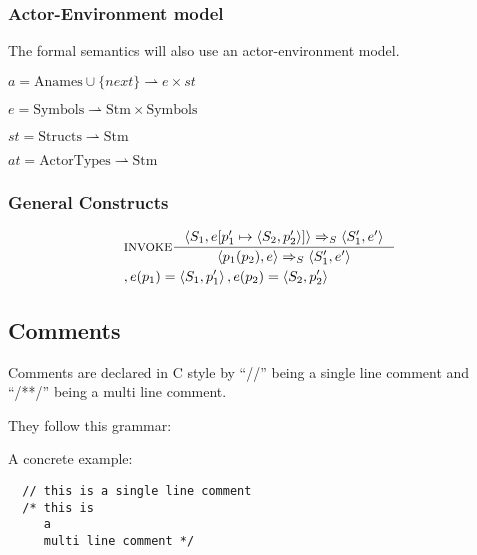 
\subsubsection{Actor-Environment model}
The formal semantics will also use an actor-environment model.

$a = \text{Anames} \cup \{next\} \rightharpoonup e \times st$

$e = \text{Symbols} \rightharpoonup \text{Stm} \times \text{Symbols}$

$st = \text{Structs} \rightharpoonup \text{Stm}$

$at = \text{ActorTypes} \rightharpoonup \text{Stm}$

\subsubsection{General Constructs}
\begin{align*}
&\inference[$\text{INVOKE}$]{\Braket{S_1,e[p_1' \mapsto \Braket{S_2,p_2'}]} \Rightarrow_S \Braket{S_1',e'}}
                  {\Braket{p_1(p_2),e} \Rightarrow_S \Braket{S_1',e'}}
\\
&									{,e(p_1) = \Braket{S_1,p_1'}, e(p_2) = \Braket{S_2,p_2'}}
\end{align*}

\subsection{Comments}
\label{subsec:comments}

Comments are declared in C style by \enquote{//} being a single line comment and \enquote{/**/} being a multi line comment.

They follow this grammar:


A concrete example:

\begin{verbatim}
  // this is a single line comment
  /* this is
     a
     multi line comment */
\end{verbatim}